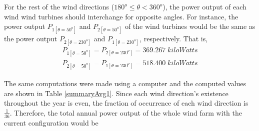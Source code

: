     For the rest of the wind directions ($180^o\leq \theta<360^o$), the power output of each wind wind turbines should interchange for opposite angles. For instance, the power output $P_{1[\theta=50^o]}$ and $P_{2[\theta=50^o]}$ of the wind turbines would be the same as the power output $P_{2[\theta=230^o]}$ and $P_{1[\theta=230^o]}$, respectively. That is,
    \begin{align*}
        P_{1[\theta=50^o]} = P_{2[\theta=230^o]} = 369.267\;kiloWatts \\
        P_{2[\theta=50^o]} = P_{1[\theta=230^o]} = 518.400\;kiloWatts
    \end{align*}
    
    The same computations were made using a computer and the computed values are shown in Table \ref{summaryAvg1}. Since each wind direction's existence throughout the year is even, the fraction of occurrence of each wind direction is $\frac{1}{36}$. Therefore, the total annual power output of the whole wind farm with the current configuration would be
    
